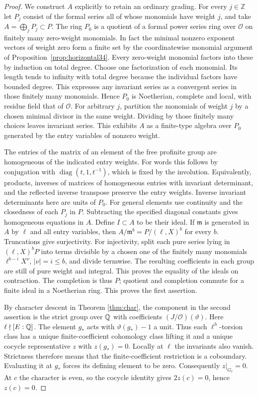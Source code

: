 \documentclass[a4paper,11pt]{article}
\theoremstyle{definition}
\theoremstyle{remark}
\newcommand{\ZZ}{\mathbb Z}\newcommand{\ord}{\operatorname{ord}}
\numberwithin{equation}{section}
\newcommand{\OO}{\mathcal O}
\begin{document}
\begin{proof}
We construct \(A\) explicitly to retain an ordinary grading. For every \(j\in\ZZ\) let \(P_j\) consist of the formal series all of whose monomials have weight \(j\), and take \(A=\bigoplus_j P_j\subset P\). The ring \(P_0\) is a quotient of a formal power series ring over \(\OO\) on finitely many zero-weight monomials. In fact the minimal nonzero exponent vectors of weight zero form a finite set by the coordinatewise monomial argument of Proposition~\ref{prop:horizontal34}. Every zero-weight monomial factors into these by induction on total degree. Choose one factorization of each monomial. Its length tends to infinity with total degree because the individual factors have bounded degree. This expresses any invariant series as a convergent series in those finitely many monomials. Hence \(P_0\) is Noetherian, complete and local, with residue field that of \(\OO\). For arbitrary \(j\), partition the monomials of weight \(j\) by a chosen minimal divisor in the same weight. Dividing by those finitely many choices leaves invariant series. This exhibits \(A\) as a finite-type algebra over \(P_0\) generated by the entry variables of nonzero weight.

The entries of the matrix of an element of the free profinite group are homogeneous of the indicated entry weights. For words this follows by conjugation with \(\operatorname{diag}(t,1,t^{-1})\), which is fixed by the involution. Equivalently, products, inverses of matrices of homogeneous entries with invariant determinant, and the reflected inverse transpose preserve the entry weights. Inverse invariant determinants here are units of \(P_0\). For general elements use continuity and the closedness of each \(P_j\) in \(P\). Subtracting the specified diagonal constants gives homogeneous equations in \(A\). Define \(I\subset A\) to be their ideal. If \(\mathfrak m\) is generated in \(A\) by \(\ell\) and all entry variables, then \(A/\mathfrak m^b=P/(\ell,X)^b\) for every \(b\). Truncations give surjectivity. For injectivity, split each pure series lying in \((\ell,X)^bP\) into terms divisible by a chosen one of the finitely many monomials \(\ell^{b-i}X^\nu\), \(|\nu|=i\le b\), and divide termwise. The resulting coefficients in each group are still of pure weight and integral. This proves the equality of the ideals on contraction. The completion is thus \(P\); quotient and completion commute for a finite ideal in a Noetherian ring. This proves the first assertion.

By character descent in Theorem \ref{thm:char}, the component in the second assertion is the strict group over \(\mathbb Q\) with coefficients \((J/\OO)(\vartheta)\). Here \(\ell\nmid [E:\mathbb Q]\). The element \(g_*\) acts with \(\vartheta(g_*)-1\) a unit. Thus each \(\ell^h\)-torsion class has a unique finite-coefficient cohomology class lifting it and a unique cocycle representative \(z\) with \(z(g_*)=0\). Locally at \(\ell\) the invariants also vanish. Strictness therefore means that the finite-coefficient restriction is a coboundary. Evaluating it at \(g_*\) forces its defining element to be zero. Consequently \(z|_{G_\ell}=0\). At \(c\) the character is even, so the cocycle identity gives \(2z(c)=0\), hence \(z(c)=0\).


\end{proof}
\end{document}
